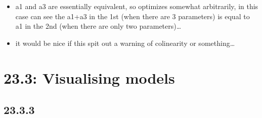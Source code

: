 \documentclass[]{book}
\providecommand{\tightlist}{%
  \setlength{\itemsep}{0pt}\setlength{\parskip}{0pt}}
\theoremstyle{definition}
\theoremstyle{definition}
\theoremstyle{definition}
\theoremstyle{remark}
\begin{document}
\begin{itemize}
\tightlist
\item
  a1 and a3 are essentially equivalent, so optimizes somewhat
  arbitrarily, in this case can see the a1+a3 in the 1st (when there are
  3 parameters) is equal to a1 in the 2nd (when there are only two
  parameters)\ldots{}
\item
  it would be nice if this spit out a warning of colinearity or
  something\ldots{}
\end{itemize}

\hypertarget{visualising-models}{%
\section{23.3: Visualising models}\label{visualising-models}}

\hypertarget{section-79}{%
\subsection{23.3.3}\label{section-79}}
\end{document}

